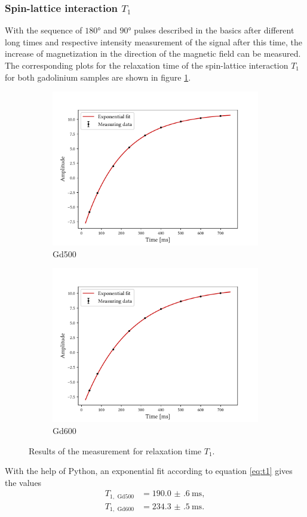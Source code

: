 \subsubsection{Spin-lattice interaction $T_1$}
With the sequence of $\ang{180}$ and $\ang{90}$ pulses described in the basics after different long times and respective intensity measurement of the signal after this time, the increase of magnetization in the direction of the magnetic field can be measured.\\
The corresponding plots for the relaxation time of the spin-lattice interaction $T_1$ for both gadolinium samples are shown in figure \ref{fig:t1}.
\begin{figure}[ht]
\begin{subfigure}{.45\textwidth}
\includegraphics[width=9.3cm]{..//figures//f61_abb_1.pdf}
\caption{Gd500}
\end{subfigure}
\qquad
\begin{subfigure}{.45\textwidth}
\includegraphics[width=9.3cm]{..//figures//f61_abb_1_600.pdf}
\caption{Gd600}
\end{subfigure}
\caption{Results of the measurement for relaxation time $T_1$.}
\label{fig:t1}
\end{figure}
With the help of Python, an exponential fit according to equation \ref{eq:t1} gives the values
\begin{align*}
T_{1,\text{ Gd500}}&=\SI{190.0(6)}{\milli\second},\\
T_{1,\text{ Gd600}}&=\SI{234.3(5)}{\milli\second}.
\end{align*}

